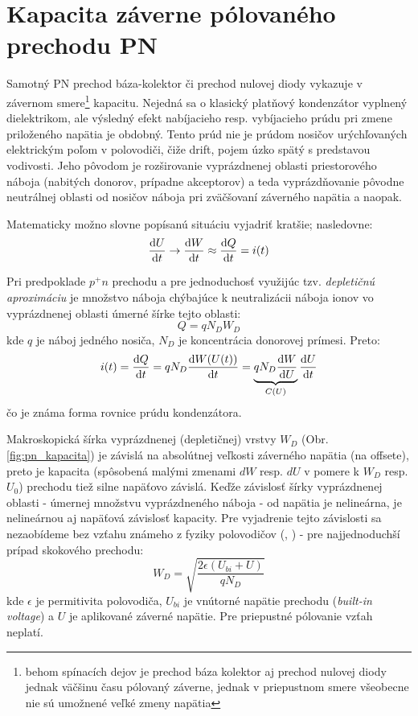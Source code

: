 \section{Kapacita záverne pólovaného prechodu PN} \label{sec:varikap}
Samotný PN prechod báza-kolektor či prechod nulovej diody vykazuje v závernom smere\footnote{behom spínacích dejov je prechod báza kolektor aj prechod nulovej diody jednak väčšinu času pólovaný záverne, jednak v priepustnom smere všeobecne nie sú umožnené veľké zmeny napätia} kapacitu. Nejedná sa o klasický platňový kondenzátor vyplnený dielektrikom, ale výsledný efekt nabíjacieho resp. vybíjacieho prúdu pri zmene priloženého napätia je obdobný. Tento prúd nie je prúdom nosičov urýchľovaných elektrickým poľom v polovodiči, čiže drift, pojem úzko spätý s predstavou vodivosti. Jeho pôvodom je rozširovanie vyprázdnenej oblasti priestorového náboja (nabitých donorov, prípadne akceptorov) a teda vyprázdňovanie pôvodne neutrálnej oblasti od nosičov náboja pri zväčšovaní záverného napätia a naopak.


Matematicky možno slovne popísanú situáciu vyjadriť kratšie; nasledovne:
\begin{equation}
    \frac{\mathrm{d} U}{\mathrm{d} t} \rightarrow \frac{\mathrm{d} W}{\mathrm{d} t} \approx \frac{\mathrm{d} Q}{\mathrm{d} t} = i(t)
    \label{eq:dU->dW->dQ}
\end{equation}

Pri predpoklade $p^+n$ prechodu a pre jednoduchosť využijúc tzv. \textit{depletičnú aproximáciu} je množstvo náboja chýbajúce k neutralizácii náboja ionov vo vyprázdnenej oblasti úmerné šírke tejto oblasti:
\begin{equation}
    Q = q N_D W_D
    \label{eq:Q--qNW}
\end{equation}
kde $q$ je náboj jedného nosiča, $N_D$ je koncentrácia donorovej prímesi.
Preto:
\begin{equation}
    i(t) = \frac{\mathrm{d} Q}{\mathrm{d} t} = q N_D \frac{\mathrm{d} W(U(t))}{\mathrm{d} t} = \underbrace{q N_D \frac{\mathrm{d} W}{\mathrm{d} U}}_{C(U)}\frac{\mathrm{d} U}{\mathrm{d} t} 
    \label{eq:dQdt--qN.dWdU.dUdt}
\end{equation}
čo je známa forma rovnice prúdu kondenzátora.


Makroskopická šírka vyprázdnenej (depletičnej) vrstvy $W_D$ (Obr. \ref{fig:pn_kapacita}) je závislá na absolútnej veľkosti záverného napätia (na offsete), preto je kapacita (spôsobená malými zmenami $dW$ resp. $dU$ v pomere k $W_D$ resp. $U_0$) prechodu tiež silne napäťovo závislá.
Keďže závislosť šírky vyprázdnenej oblasti - úmernej množstvu vyprázdneného náboja - od napätia je nelineárna, je nelineárnou aj napäťová závislosť kapacity. 
Pre vyjadrenie tejto závislosti sa nezaobídeme bez vzťahu známeho z fyziky polovodičov (\cite{lutz}, \cite{baliga}) - pre najjednoduchší prípad skokového prechodu:
\begin{equation}
    W_D = \sqrt{\frac{2 \epsilon (U_{bi} + U)}{q N_D}}
    \label{eq:Wd--fU}
\end{equation}
kde $\epsilon$ je permitivita polovodiča, $U_{bi}$ je vnútorné napätie prechodu (\textit{built-in voltage}) a $U$ je aplikované záverné napätie. Pre priepustné pólovanie vzťah neplatí.

